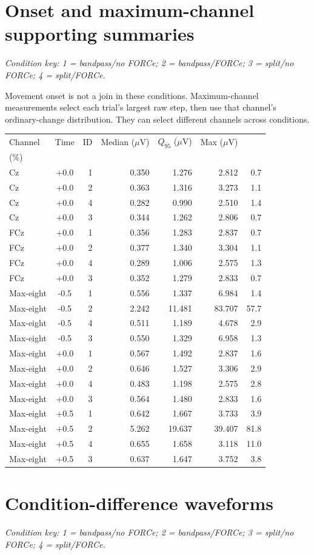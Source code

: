 \documentclass[11pt,a4paper]{article}
\newcommand{\uv}{\ensuremath{\mu\mathrm{V}}}
\begin{document}
\section{Onset and maximum-channel supporting summaries}
\textit{Condition key: 1 = bandpass/no FORCe; 2 = bandpass/FORCe; 3 = split/no FORCe; 4 = split/FORCe.}

Movement onset is not a join in these conditions. Maximum-channel measurements select each trial's largest raw step, then use that channel's ordinary-change distribution. They can select different channels across conditions.
\begin{center}\small\begin{tabular}{lcrrrrr}\toprule
Channel & Time & ID & Median (\uv) & $Q_{95}$ (\uv) & Max (\uv) & \shortstack{Trials $\geq Q_{99}$\\(\%)} \\
\midrule
Cz & +0.0 & 1 & 0.350 & 1.276 & 2.812 & 0.7 \\
Cz & +0.0 & 2 & 0.363 & 1.316 & 3.273 & 1.1 \\
Cz & +0.0 & 4 & 0.282 & 0.990 & 2.510 & 1.4 \\
Cz & +0.0 & 3 & 0.344 & 1.262 & 2.806 & 0.7 \\
FCz & +0.0 & 1 & 0.356 & 1.283 & 2.837 & 0.7 \\
FCz & +0.0 & 2 & 0.377 & 1.340 & 3.304 & 1.1 \\
FCz & +0.0 & 4 & 0.289 & 1.006 & 2.575 & 1.3 \\
FCz & +0.0 & 3 & 0.352 & 1.279 & 2.833 & 0.7 \\
Max-eight & -0.5 & 1 & 0.556 & 1.337 & 6.984 & 1.4 \\
Max-eight & -0.5 & 2 & 2.242 & 11.481 & 83.707 & 57.7 \\
Max-eight & -0.5 & 4 & 0.511 & 1.189 & 4.678 & 2.9 \\
Max-eight & -0.5 & 3 & 0.550 & 1.329 & 6.958 & 1.3 \\
Max-eight & +0.0 & 1 & 0.567 & 1.492 & 2.837 & 1.6 \\
Max-eight & +0.0 & 2 & 0.646 & 1.527 & 3.306 & 2.9 \\
Max-eight & +0.0 & 4 & 0.483 & 1.198 & 2.575 & 2.8 \\
Max-eight & +0.0 & 3 & 0.564 & 1.480 & 2.833 & 1.6 \\
Max-eight & +0.5 & 1 & 0.642 & 1.667 & 3.733 & 3.9 \\
Max-eight & +0.5 & 2 & 5.262 & 19.637 & 39.407 & 81.8 \\
Max-eight & +0.5 & 4 & 0.655 & 1.658 & 3.118 & 11.0 \\
Max-eight & +0.5 & 3 & 0.637 & 1.647 & 3.752 & 3.8 \\
\bottomrule\end{tabular}\end{center}
\clearpage\section{Condition-difference waveforms}
\textit{Condition key: 1 = bandpass/no FORCe; 2 = bandpass/FORCe; 3 = split/no FORCe; 4 = split/FORCe.}
\end{document}
